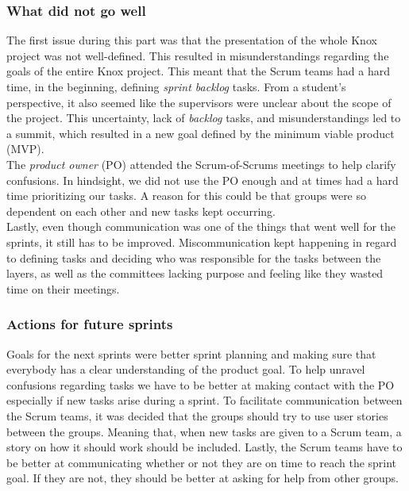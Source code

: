 \subsubsection{What did not go well}
The first issue during this part was that the presentation of the whole Knox project was not well-defined. This resulted in misunderstandings regarding the goals of the entire Knox project. This meant that the Scrum teams had a hard time, in the beginning, defining \textit{sprint backlog} tasks. From a student's perspective, it also seemed like the supervisors were unclear about the scope of the project. This uncertainty, lack of \textit{backlog} tasks, and misunderstandings led to a summit, which resulted in a new goal defined by the minimum viable product (MVP).\\

\noindent The \textit{product owner} (PO) attended the Scrum-of-Scrums meetings to help clarify confusions. In hindsight, we did not use the PO enough and at times had a hard time prioritizing our tasks. A reason for this could be that groups were so dependent on each other and new tasks kept occurring. \\

\noindent Lastly, even though communication was one of the things that went well for the sprints, it still has to be improved. Miscommunication kept happening in regard to defining tasks and deciding who was responsible for the tasks between the layers, as well as the committees lacking purpose and feeling like they wasted time on their meetings.

\subsubsection{Actions for future sprints}
Goals for the next sprints were better sprint planning and making sure that everybody has a clear understanding of the product goal. 
To help unravel confusions regarding tasks we have to be better at making contact with the PO especially if new tasks arise during a sprint. 
To facilitate communication between the Scrum teams, it was decided that the groups should try to use user stories between the groups. Meaning that, when new tasks are given to a Scrum team, a story on how it should work should be included.
Lastly, the Scrum teams have to be better at communicating whether or not they are on time to reach the sprint goal. If they are not, they should be better at asking for help from other groups. 